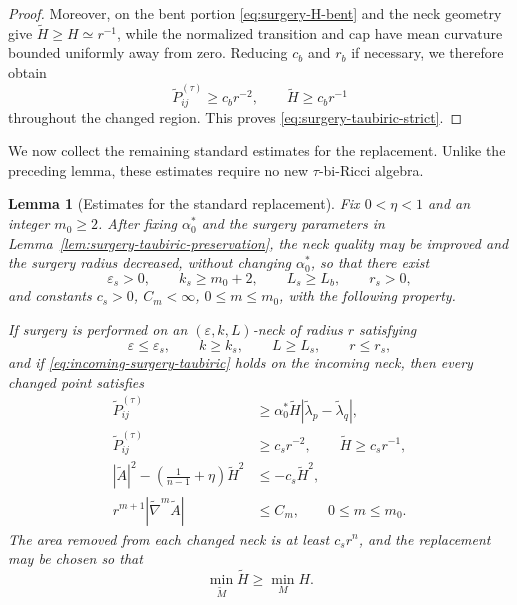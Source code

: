 \documentclass[11pt,reqno]{amsart}
\newtheorem{lemma}[proposition]{Lemma}
\theoremstyle{definition}
\theoremstyle{remark}
\numberwithin{equation}{section}
\newcommand{\eps}{\varepsilon}
\begin{document}
\begin{proof}
Moreover, on the bent portion
\eqref{eq:surgery-H-bent} and the neck geometry give
$\widetilde H\geq H\simeq r^{-1}$, while the normalized transition and
cap have mean curvature bounded uniformly away from zero.  Reducing
$c_b$ and $r_b$ if necessary, we therefore obtain
\begin{equation*}
    \widetilde P_{ij}^{(\tau)}
    \geq c_b r^{-2},
    \qquad
    \widetilde H\geq c_b r^{-1}
\end{equation*}
throughout the changed region.  This proves
\eqref{eq:surgery-taubiric-strict}.
\end{proof}


We now collect the remaining standard estimates for the replacement.
Unlike the preceding lemma, these estimates require no new
$\tau$-bi-Ricci algebra.

\begin{lemma}[Estimates for the standard replacement]
  \label{lem:standard-replacement}
  Fix $0<\eta<1$ and an integer $m_0\geq2$.  After fixing
  $\alpha_0^*$ and the surgery parameters in
  Lemma~\ref{lem:surgery-taubiric-preservation}, the neck quality may be
  improved and the surgery radius decreased, without changing
  $\alpha_0^*$, so that there exist
  \begin{equation*}
  \eps_s>0,\qquad
  k_s\geq m_0+2,\qquad
  L_s\geq L_b,\qquad
  r_s>0,
  \end{equation*}
  and constants $c_s>0$, $C_m<\infty$, $0\leq m\leq m_0$, with the
  following property.

  If surgery is performed on an $(\eps,k,L)$-neck of radius $r$ satisfying
  \begin{equation*}
  \eps\leq\eps_s,\qquad
  k\geq k_s,\qquad
  L\geq L_s,\qquad
  r\leq r_s,
  \end{equation*}
  and if \eqref{eq:incoming-surgery-taubiric} holds on the incoming neck,
  then every changed point satisfies
  \begin{align}
    \widetilde P_{ij}^{(\tau)}
    &\geq
    \alpha_0^*\widetilde H
    |\widetilde\lambda_p-\widetilde\lambda_q|,
    \label{eq:standard-replacement-taubiric}\\
    \widetilde P_{ij}^{(\tau)}
    &\geq c_sr^{-2},
    \qquad
    \widetilde H\geq c_sr^{-1},
    \label{eq:standard-replacement-strict}\\
    |\widetilde A|^2-
    \left(\frac1{n-1}+\eta\right)\widetilde H^2
    &\leq
    -c_s\widetilde H^2,
    \label{eq:surgery-cylindrical-margin}\\
    r^{m+1}|\widetilde\nabla^m\widetilde A|
    &\leq C_m,
    \qquad
    0\leq m\leq m_0.
    \label{eq:surgery-derivative-model}
  \end{align}
  The area removed from each changed neck is at least $c_sr^n$, and the
  replacement may be chosen so that
  \begin{equation}\label{eq:surgery-minimum-H}
    \min_{\widetilde M}\widetilde H
    \geq
    \min_MH.
  \end{equation}


\end{lemma}
\end{document}

